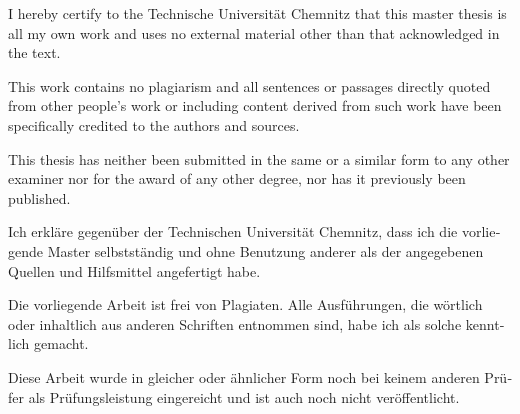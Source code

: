 
\begin{tucerklaerung}
I hereby certify to the Technische Universität Chemnitz that this master thesis is all my own work and uses no external material other than that acknowledged in the text.

This work contains no plagiarism and all sentences or passages directly
quoted from other people's work or including content derived from such work
have been specifically credited to the authors and sources.

This thesis has neither been submitted in the same or a similar form to any
other examiner nor for the award of any other degree, nor has it previously
been published.


\end{tucerklaerung}

\begin{otherlanguage}{ngerman}
\begin{tucerklaerung}
Ich erkläre gegenüber der Technischen Universität Chemnitz, dass ich die
vorliegende Master selbstständig und ohne Benutzung anderer
als der angegebenen Quellen und Hilfsmittel angefertigt habe.

Die vorliegende Arbeit ist frei von Plagiaten. Alle Ausführungen, die wörtlich
oder inhaltlich aus anderen Schriften entnommen sind, habe ich als solche
kenntlich gemacht.

Diese Arbeit wurde in gleicher oder ähnlicher Form noch bei keinem anderen
Prüfer als Prüfungsleistung eingereicht und ist auch noch nicht veröffentlicht.


\end{tucerklaerung}
\end{otherlanguage}
